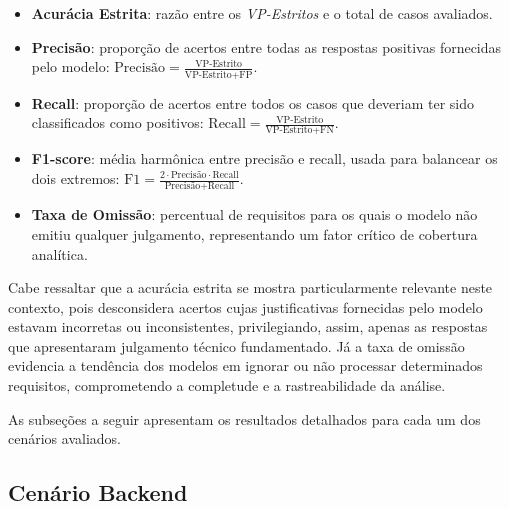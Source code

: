 \begin{itemize}
    \item \textbf{Acurácia Estrita}: razão entre os \textit{VP-Estritos} e o total de casos avaliados.
    \item \textbf{Precisão}: proporção de acertos entre todas as respostas positivas fornecidas pelo modelo: $\text{Precisão} = \frac{\text{VP-Estrito}}{\text{VP-Estrito} + \text{FP}}$.
    \item \textbf{Recall}: proporção de acertos entre todos os casos que deveriam ter sido classificados como positivos: $\text{Recall} = \frac{\text{VP-Estrito}}{\text{VP-Estrito} + \text{FN}}$.
    \item \textbf{F1-score}: média harmônica entre precisão e recall, usada para balancear os dois extremos: $\text{F1} = \frac{2 \cdot \text{Precisão} \cdot \text{Recall}}{\text{Precisão} + \text{Recall}}$.
    \item \textbf{Taxa de Omissão}: percentual de requisitos para os quais o modelo não emitiu qualquer julgamento, representando um fator crítico de cobertura analítica.
\end{itemize}

Cabe ressaltar que a acurácia estrita se mostra particularmente relevante neste contexto, pois desconsidera acertos cujas justificativas fornecidas pelo modelo estavam incorretas ou inconsistentes, privilegiando, assim, apenas as respostas que apresentaram julgamento técnico fundamentado. Já a taxa de omissão evidencia a tendência dos modelos em ignorar ou não processar determinados requisitos, comprometendo a completude e a rastreabilidade da análise.

As subseções a seguir apresentam os resultados detalhados para cada um dos cenários avaliados.

\subsection{Cenário Backend}

